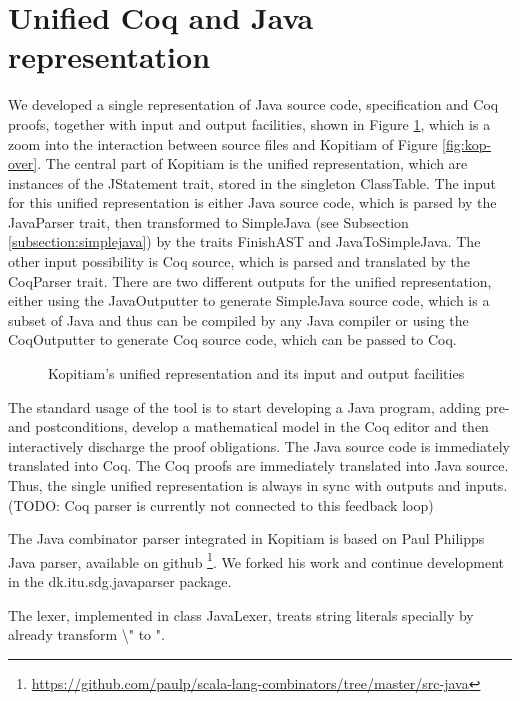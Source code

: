 \documentclass{article}
\begin{document}
\section{Unified Coq and Java representation} \label{section:representation}
We developed a single representation of Java source code, specification and Coq proofs, together with input and output facilities, shown in Figure \ref{fig:repr}, which is a zoom into the interaction between source files and Kopitiam of Figure \ref{fig:kop-over}. The central part of Kopitiam is the unified representation, which are instances of the JStatement trait, stored in the singleton ClassTable. The input for this unified representation is either Java source code, which is parsed by the JavaParser trait, then transformed to SimpleJava (see Subsection \ref{subsection:simplejava}) by the traits FinishAST and JavaToSimpleJava. The other input possibility is Coq source, which is parsed and translated by the CoqParser trait. There are two different outputs for the unified representation, either using the JavaOutputter to generate SimpleJava source code, which is a subset of Java and thus can be compiled by any Java compiler or using the CoqOutputter to generate Coq source code, which can be passed to Coq.

\begin{figure}
\centering
{}
\caption{Kopitiam's unified representation and its input and output facilities}
\label{fig:repr}
\end{figure}

The standard usage of the tool is to start developing a Java program, adding pre- and postconditions, develop a mathematical model in the Coq editor and then interactively discharge the proof obligations. The Java source code is immediately translated into Coq. The Coq proofs are immediately translated into Java source. Thus, the single unified representation is always in sync with outputs and inputs. (TODO: Coq parser is currently not connected to this feedback loop)

The Java combinator parser integrated in Kopitiam is based on Paul Philipps Java parser, available on github \footnote{\url{https://github.com/paulp/scala-lang-combinators/tree/master/src-java}}. We forked his work and continue development in the dk.itu.sdg.javaparser package.

The lexer, implemented in class JavaLexer, treats string literals specially by already transform \textbackslash" to ".
\end{document}
